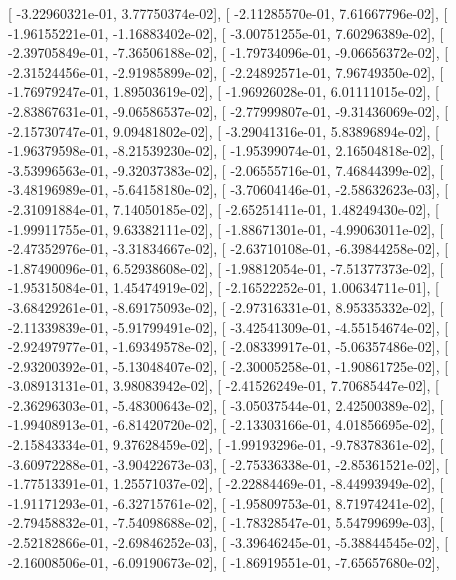 \documentclass{article}
\begin{document}
       [ -3.22960321e-01,   3.77750374e-02],
       [ -2.11285570e-01,   7.61667796e-02],
       [ -1.96155221e-01,  -1.16883402e-02],
       [ -3.00751255e-01,   7.60296389e-02],
       [ -2.39705849e-01,  -7.36506188e-02],
       [ -1.79734096e-01,  -9.06656372e-02],
       [ -2.31524456e-01,  -2.91985899e-02],
       [ -2.24892571e-01,   7.96749350e-02],
       [ -1.76979247e-01,   1.89503619e-02],
       [ -1.96926028e-01,   6.01111015e-02],
       [ -2.83867631e-01,  -9.06586537e-02],
       [ -2.77999807e-01,  -9.31436069e-02],
       [ -2.15730747e-01,   9.09481802e-02],
       [ -3.29041316e-01,   5.83896894e-02],
       [ -1.96379598e-01,  -8.21539230e-02],
       [ -1.95399074e-01,   2.16504818e-02],
       [ -3.53996563e-01,  -9.32037383e-02],
       [ -2.06555716e-01,   7.46844399e-02],
       [ -3.48196989e-01,  -5.64158180e-02],
       [ -3.70604146e-01,  -2.58632623e-03],
       [ -2.31091884e-01,   7.14050185e-02],
       [ -2.65251411e-01,   1.48249430e-02],
       [ -1.99911755e-01,   9.63382111e-02],
       [ -1.88671301e-01,  -4.99063011e-02],
       [ -2.47352976e-01,  -3.31834667e-02],
       [ -2.63710108e-01,  -6.39844258e-02],
       [ -1.87490096e-01,   6.52938608e-02],
       [ -1.98812054e-01,  -7.51377373e-02],
       [ -1.95315084e-01,   1.45474919e-02],
       [ -2.16522252e-01,   1.00634711e-01],
       [ -3.68429261e-01,  -8.69175093e-02],
       [ -2.97316331e-01,   8.95335332e-02],
       [ -2.11339839e-01,  -5.91799491e-02],
       [ -3.42541309e-01,  -4.55154674e-02],
       [ -2.92497977e-01,  -1.69349578e-02],
       [ -2.08339917e-01,  -5.06357486e-02],
       [ -2.93200392e-01,  -5.13048407e-02],
       [ -2.30005258e-01,  -1.90861725e-02],
       [ -3.08913131e-01,   3.98083942e-02],
       [ -2.41526249e-01,   7.70685447e-02],
       [ -2.36296303e-01,  -5.48300643e-02],
       [ -3.05037544e-01,   2.42500389e-02],
       [ -1.99408913e-01,  -6.81420720e-02],
       [ -2.13303166e-01,   4.01856695e-02],
       [ -2.15843334e-01,   9.37628459e-02],
       [ -1.99193296e-01,  -9.78378361e-02],
       [ -3.60972288e-01,  -3.90422673e-03],
       [ -2.75336338e-01,  -2.85361521e-02],
       [ -1.77513391e-01,   1.25571037e-02],
       [ -2.22884469e-01,  -8.44993949e-02],
       [ -1.91171293e-01,  -6.32715761e-02],
       [ -1.95809753e-01,   8.71974241e-02],
       [ -2.79458832e-01,  -7.54098688e-02],
       [ -1.78328547e-01,   5.54799699e-03],
       [ -2.52182866e-01,  -2.69846252e-03],
       [ -3.39646245e-01,  -5.38844545e-02],
       [ -2.16008506e-01,  -6.09190673e-02],
       [ -1.86919551e-01,  -7.65657680e-02],
\end{document}
